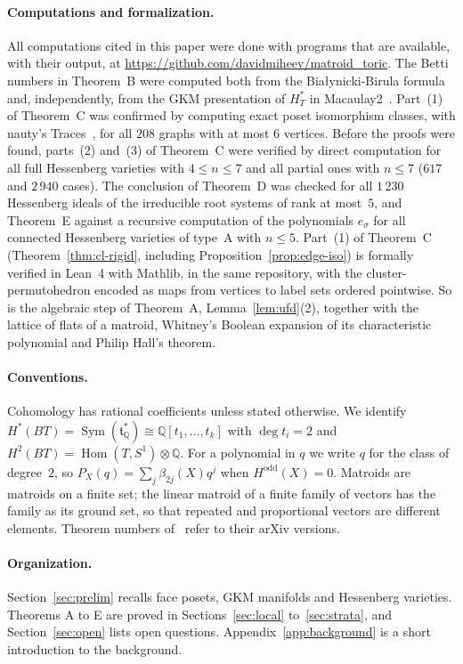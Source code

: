 \documentclass[11pt,a4paper]{article}
\numberwithin{equation}{section}
\theoremstyle{plain}
\theoremstyle{definition}
\theoremstyle{remark}
\newcommand{\Q}{\mathbb{Q}}
\newcommand{\HT}{H^{*}_{T}}
\DeclareMathOperator{\Sym}{Sym}
\DeclareMathOperator{\Hom}{Hom}
\begin{document}
\paragraph{Computations and formalization.}
All computations cited in this paper were done with programs that are available, with their output, at \url{https://github.com/davidmiheev/matroid_toric}. The Betti numbers in Theorem~B were computed both from the Białynicki-Birula formula and, independently, from the GKM presentation of $\HT$ in Macaulay2~\cite{M2}. Part~(1) of Theorem~C was confirmed by computing exact poset isomorphism classes, with nauty's Traces~\cite{MP14}, for all $208$ graphs with at most $6$ vertices. Before the proofs were found, parts~(2) and~(3) of Theorem~C were verified by direct computation for all full Hessenberg varieties with $4\leqslant n\leqslant7$ and all partial ones with $n\leqslant7$ ($617$ and $2\,940$ cases). The conclusion of Theorem~D was checked for all $1\,230$ Hessenberg ideals of the irreducible root systems of rank at most~$5$, and Theorem~E against a recursive computation of the polynomials $e_\sigma$ for all connected Hessenberg varieties of type~A with $n\leqslant5$. Part~(1) of Theorem~C (Theorem~\ref{thm:cl-rigid}, including Proposition~\ref{prop:edge-iso}) is formally verified in Lean~4 with Mathlib, in the same repository, with the cluster-permutohedron encoded as maps from vertices to label sets ordered pointwise. So is the algebraic step of Theorem~A, Lemma~\ref{lem:ufd}(2), together with the lattice of flats of a matroid, Whitney's Boolean expansion of its characteristic polynomial and Philip Hall's theorem.

\paragraph{Conventions.}
Cohomology has rational coefficients unless stated otherwise. We identify $H^*(BT)=\Sym(\mathfrak t^*_\Q)\cong\Q[t_1,\dots,t_k]$ with $\deg t_i=2$ and $H^2(BT)=\Hom(T,S^1)\otimes\Q$. For a polynomial in $q$ we write $q$ for the class of degree~$2$, so $P_X(q)=\sum_j\beta_{2j}(X)q^j$ when $H^{\mathrm{odd}}(X)=0$. Matroids are matroids on a finite set; the linear matroid of a finite family of vectors has the family as its ground set, so that repeated and proportional vectors are different elements. Theorem numbers of~\cite{AB21,AB24,AC22} refer to their arXiv versions.

\paragraph{Organization.}
Section~\ref{sec:prelim} recalls face posets, GKM manifolds and Hessenberg varieties. Theorems A to E are proved in Sections~\ref{sec:local} to~\ref{sec:strata}, and Section~\ref{sec:open} lists open questions. Appendix~\ref{app:background} is a short introduction to the background.
\end{document}
